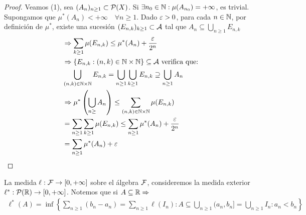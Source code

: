 \begin{theorem}
\begin{proof}
        Veamos (1), sea \((A_n)_{n \geq 1} \subset \mathcal{P}(X)\). Si \(\exists n_0 \in \mathbb{N} : \mu(A_{n_0}) = +\infty\), es trivial. Supongamos que \(\mu^*(A_n) < +\infty \quad \forall n \geq 1\).
        Dado \(\varepsilon > 0\), para cada \(n \in \mathbb{N}\), por definición de \(\mu^*\), existe una sucesión \((E_{n, k})_{k \geq 1} \subset \mathcal{A}\) tal que \(A_n \subseteq \bigcup_{n \geq 1} E_{n, k}\)
        \begin{align*}
             & \Rightarrow \sum_{k \geq 1} \mu(E_{n, k}) \leq \mu^*(A_n) + \frac{\varepsilon}{2^n}                                                    \\
             & \Rightarrow \left\{ E_{n, k} : (n, k) \in \mathbb{N} \times \mathbb{N} \right\} \subseteq \mathcal{A} \text{ verifica que:}                        \\
             & \bigcup_{(n, k) \in \mathbb{N} \times \mathbb{N}} E_{n, k}  = \bigcup_{n \geq 1} \bigcup_{k \geq 1} E_{n, k} \supseteq \bigcup_{n \geq 1} A_n \\
             & \Rightarrow \mu^*\left( \bigcup_{n \geq } A_n \right) \leq \sum_{(n, k) \in \mathbb{N} \times \mathbb{N}} \mu(E_{n, k})                       \\
             & = \sum_{n \geq 1} \sum_{k \geq 1} \mu(E_{n, k}) \leq \sum_{n \geq 1} \mu^*(A_n) + \frac{\varepsilon}{2^n}                              \\
             & = \sum_{n \geq 1} \mu^*(A_n) + \varepsilon
        \end{align*}
    \end{proof}
\end{theorem}

\begin{eg}
    La medida \(\ell : \mathcal{F} \to [0, +\infty]\) sobre el álgebra \(\mathcal{F}\), consideremos la medida exterior \(\ell^*: \mathcal{P}(\mathbb{R}) \to [0, +\infty]\).
    Notemos que si \(A \subseteq \mathbb{R} \Rightarrow\) \begin{align*}
        \ell^*(A) = \inf \left\{ \sum_{n \geq 1} (b_n - a_n) = \sum_{n \geq 1} \ell(I_n) : A \subseteq \bigcup_{n \geq 1} (a_n, b_n] = \bigcup_{n \geq 1}  I_n : a_n < b_n \right\}
    \end{align*}
\end{eg}



